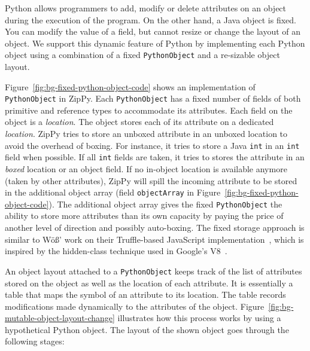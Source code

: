 Python allows programmers to add, modify or delete attributes on an object during the execution of the program.
On the other hand, a Java object is fixed.
You can modify the value of a field, but cannot resize or change the layout of an object.
We support this dynamic feature of Python by implementing each Python object using a combination of a fixed \texttt{PythonObject} and a re-sizable object layout.

Figure~\ref{fig:bg-fixed-python-object-code} shows an implementation of \texttt{PythonObject} in ZipPy.
Each \texttt{PythonObject} has a fixed number of fields of both primitive and reference types to accommodate its attributes.
Each field on the object is a \emph{location}.
The object stores each of its attribute on a dedicated \emph{location}.
ZipPy tries to store an unboxed attribute in an unboxed location to avoid the overhead of boxing.
For instance, it tries to store a Java \texttt{int} in an \texttt{int} field when possible.
If all \texttt{int} fields are taken, it tries to stores the attribute in an \emph{boxed} location or an object field.
If no in-object location is available anymore (taken by other attributes), ZipPy will spill the incoming attribute to be stored in the additional object array (field \texttt{objectArray} in Figure~\ref{fig:bg-fixed-python-object-code}).
The additional object array gives the fixed \texttt{PythonObject} the ability to store more attributes than its own capacity by paying the price of another level of direction and possibly auto-boxing.
The fixed storage approach is similar to W\"{o}\ss' work on their Truffle-based JavaScript implementation~\cite{WoB+2014}, which is inspired by the hidden-class technique used in Google's V8~\cite{v8}.

An object layout attached to a \texttt{PythonObject} keeps track of the list of attributes stored on the object as well as the location of each attribute.
It is essentially a table that maps the symbol of an attribute to its location.
The table records modifications made dynamically to the attributes of the object.
Figure~\ref{fig:bg-mutable-object-layout-change} illustrates how this process works by using a hypothetical Python object.
The layout of the shown object goes through the following stages:

